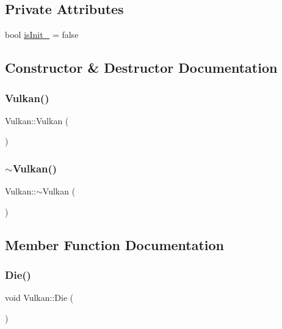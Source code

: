 \subsection*{Private Attributes}
\begin{DoxyCompactItemize}
\item 
bool \mbox{\hyperlink{classVulkan_aa19833e837744cc2f6b1f93c1d66a693}{is\+Init\+\_\+}} = false
\end{DoxyCompactItemize}


\subsection{Constructor \& Destructor Documentation}
\mbox{\label{classVulkan_a69c8a0222ecd2f24887acc75a7ffd922}} 
\subsubsection{\texorpdfstring{Vulkan()}{Vulkan()}}
{\footnotesize\ttfamily Vulkan\+::\+Vulkan (\begin{DoxyParamCaption}{ }\end{DoxyParamCaption})}

\mbox{\label{classVulkan_a85f20d6cd141ec9568d812cfdf81971f}} 
\subsubsection{\texorpdfstring{$\sim$\+Vulkan()}{~Vulkan()}}
{\footnotesize\ttfamily Vulkan\+::$\sim$\+Vulkan (\begin{DoxyParamCaption}{ }\end{DoxyParamCaption})\hspace{0.3cm}{\ttfamily [virtual]}}



\subsection{Member Function Documentation}
\mbox{\label{classVulkan_a728e47da1e42d65c6d9efa5106f6d13b}} 
\subsubsection{\texorpdfstring{Die()}{Die()}}
{\footnotesize\ttfamily void Vulkan\+::\+Die (\begin{DoxyParamCaption}{ }\end{DoxyParamCaption})\hspace{0.3cm}{\ttfamily [virtual]}}



